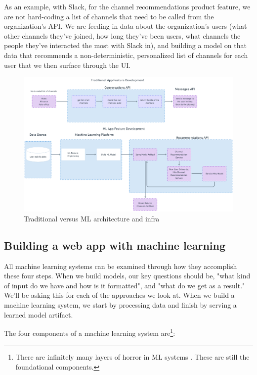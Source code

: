 \documentclass[11pt, table]{diazessay} %
\begin{document}
\begin{sloppypar}
As an example, with Slack, for the channel recommendations product feature, we are not hard-coding a list of channels that need to be called from the organization's API. We are feeding in data about the organization's users (what other channels they've joined, how long they've been users, what channels the people they've interacted the most with Slack in), and building a model on that data that recommends a non-deterministic, personalized list of channels for each user that we then surface through the UI.

\begin{figure}[H]
\centering
\includegraphics[width=.95\textwidth]{figures/mlnotml.png}
\caption{Traditional versus ML architecture and infra}
\end{figure}

\subsection{Building a web app with machine learning}

All machine learning systems can be examined through how they accomplish these four steps. When we build models, our key questions should be, "what kind of input do we have and how is it formatted", and "what do we get as a result." We'll be asking this for each of the approaches we look at.  When we build a machine learning system, we start by processing data and finish by serving a learned model artifact.

The four components of a machine learning system are\footnote{There are infinitely many layers of horror in ML systems \citep{kreuzberger2022machine}. These are still the foundational components.}:


\end{sloppypar}
\end{document}
